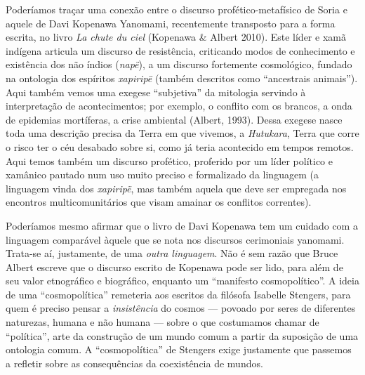 Poderíamos traçar uma conexão entre o discurso profético-metafísico de
Soria e aquele de Davi Kopenawa Yanomami, recentemente transposto para a
forma escrita, no livro \emph{La chute du ciel} (Kopenawa \& Albert
2010). Este líder e xamã indígena articula um discurso de resistência,
criticando modos de conhecimento e existência dos não índios
(\emph{napë}), a um discurso fortemente cosmológico, fundado na
ontologia dos espíritos \emph{xapiripë} (também descritos como
``ancestrais animais''). Aqui também vemos uma exegese ``subjetiva'' da
mitologia servindo à interpretação de acontecimentos; por exemplo, o
conflito com os brancos, a onda de epidemias mortíferas, a crise
ambiental (Albert, 1993). Dessa exegese nasce toda uma descrição precisa
da Terra em que vivemos, a \emph{Hutukara}, Terra que corre o risco ter
o céu desabado sobre si, como já teria acontecido em tempos remotos.
Aqui temos também um discurso profético, proferido por um líder político
e xamânico pautado num uso muito preciso e formalizado da linguagem (a
linguagem vinda dos \emph{xapiripë}, mas também aquela que deve ser
empregada nos encontros multicomunitários que visam amainar os conflitos
correntes).

Poderíamos mesmo afirmar que o livro de Davi Kopenawa tem um cuidado com
a linguagem comparável àquele que se nota nos discursos cerimoniais
yanomami. Trata-se aí, justamente, de uma \emph{outra linguagem}. Não é
sem razão que Bruce Albert escreve que o discurso escrito de Kopenawa
pode ser lido, para além de seu valor etnográfico e biográfico, enquanto
um ``manifesto cosmopolítico''. A ideia de uma ``cosmopolítica''
remeteria aos escritos da filósofa Isabelle Stengers, para quem é
preciso pensar a \emph{insistência} do cosmos --- povoado por seres de
diferentes naturezas, humana e não humana --- sobre o que costumamos
chamar de ``política'', arte da construção de um mundo comum a partir da
suposição de uma ontologia comum. A ``cosmopolítica'' de Stengers exige
justamente que passemos a refletir sobre as consequências da
coexistência de mundos.

